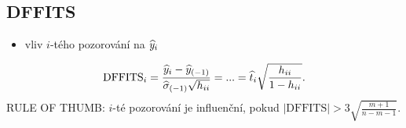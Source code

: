 \subsection*{DFFITS} \begin{itemize}
	\item vliv $i$-tého pozorování na $\widehat{y}_i$
\end{itemize}
$$ \mathrm{DFFITS}_i=\frac{\widehat{y}_i-{\widehat{y}_{(-1)}}}{{\widehat{{\sigma}}_{(-1)}}\sqrt{h_{ii}}}=...=\widehat{t}_i\sqrt{\frac{h_{ii}}{1-h_{ii}}}.$$
RULE OF THUMB: $i$-té pozorování je influenční, pokud $|\mathrm{DFFITS}|>3\sqrt{\frac{m+1}{n-m-1}}$.